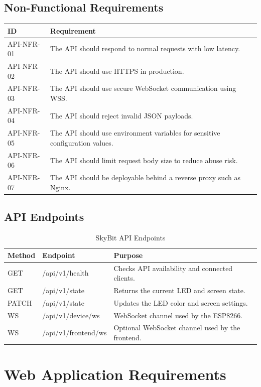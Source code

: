 \documentclass[12pt,a4paper]{report}
\begin{document}
\subsection{Non-Functional Requirements}

\begin{longtable}{p{2.5cm} p{11cm}}
\toprule
\textbf{ID} & \textbf{Requirement} \\
\midrule
API-NFR-01 & The API should respond to normal requests with low latency. \\
API-NFR-02 & The API should use HTTPS in production. \\
API-NFR-03 & The API should use secure WebSocket communication using WSS. \\
API-NFR-04 & The API should reject invalid JSON payloads. \\
API-NFR-05 & The API should use environment variables for sensitive configuration values. \\
API-NFR-06 & The API should limit request body size to reduce abuse risk. \\
API-NFR-07 & The API should be deployable behind a reverse proxy such as Nginx. \\
\bottomrule
\end{longtable}

\subsection{API Endpoints}

\begin{table}[H]
\centering
\renewcommand{\arraystretch}{1.4}
\begin{tabular}{p{3cm} p{5cm} p{6cm}}
\toprule
\textbf{Method} & \textbf{Endpoint} & \textbf{Purpose} \\
\midrule
GET & /api/v1/health & Checks API availability and connected clients. \\
GET & /api/v1/state & Returns the current LED and screen state. \\
PATCH & /api/v1/state & Updates the LED color and screen settings. \\
WS & /api/v1/device/ws & WebSocket channel used by the ESP8266. \\
WS & /api/v1/frontend/ws & Optional WebSocket channel used by the frontend. \\
\bottomrule
\end{tabular}
\caption{SkyBit API Endpoints}
\end{table}

\section{Web Application Requirements}
\end{document}
